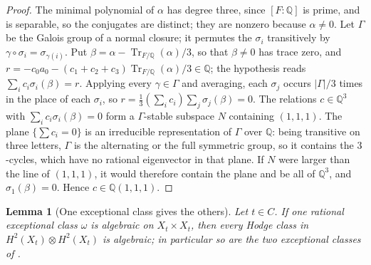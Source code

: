 \documentclass[11pt,reqno]{amsart}
\theoremstyle{plain}
\newtheorem{lemma}[theorem]{Lemma}
\theoremstyle{definition}
\theoremstyle{remark}
\newcommand{\QQ}{\mathbb{Q}}
\DeclareMathOperator{\Tr}{Tr}
\begin{document}
\begin{proof}
The minimal polynomial of $\alpha$ has degree three, since $[F:\QQ]$ is prime,
and is separable, so the conjugates are distinct; they are nonzero because
$\alpha\ne0$. Let $\Gamma$ be the Galois group of a normal closure; it
permutes the $\sigma_{i}$ transitively by $\gamma\circ\sigma_{i}=
\sigma_{\gamma(i)}$. Put $\beta=\alpha-\Tr_{F/\QQ}(\alpha)/3$, so that
$\beta\ne0$ has trace zero, and $r=-c_{0}a_{0}-(c_{1}+c_{2}+c_{3})
\Tr_{F/\QQ}(\alpha)/3\in\QQ$; the hypothesis reads $\sum_{i}c_{i}\sigma_{i}
(\beta)=r$. Applying every $\gamma\in\Gamma$ and averaging, each $\sigma_{j}$
occurs $|\Gamma|/3$ times in the place of each $\sigma_{i}$, so
$r=\frac13(\sum_{i}c_{i})\sum_{j}\sigma_{j}(\beta)=0$. The relations
$c\in\QQ^{3}$ with $\sum_{i}c_{i}\sigma_{i}(\beta)=0$ form a $\Gamma$-stable
subspace $N$ containing $(1,1,1)$. The plane $\{\sum c_{i}=0\}$ is an
irreducible representation of $\Gamma$ over $\QQ$: being transitive on three
letters, $\Gamma$ is the alternating or the full symmetric group, so it
contains the $3$-cycles, which have no rational eigenvector in that plane.
If $N$ were larger than the line of $(1,1,1)$, it would therefore contain the
plane and be all of $\QQ^{3}$, and $\sigma_{1}(\beta)=0$. Hence
$c\in\QQ(1,1,1)$.
\end{proof}

\begin{lemma}[One exceptional class gives the others]\label{lem:oneexceptional}
Let $t\in C$. If one rational exceptional class $\omega$ is algebraic on
$X_{t}\times X_{t}$, then every Hodge class in $H^{2}(X_{t})\otimes
H^{2}(X_{t})$ is algebraic; in particular so are the two exceptional classes
of .
\end{lemma}
\end{document}
